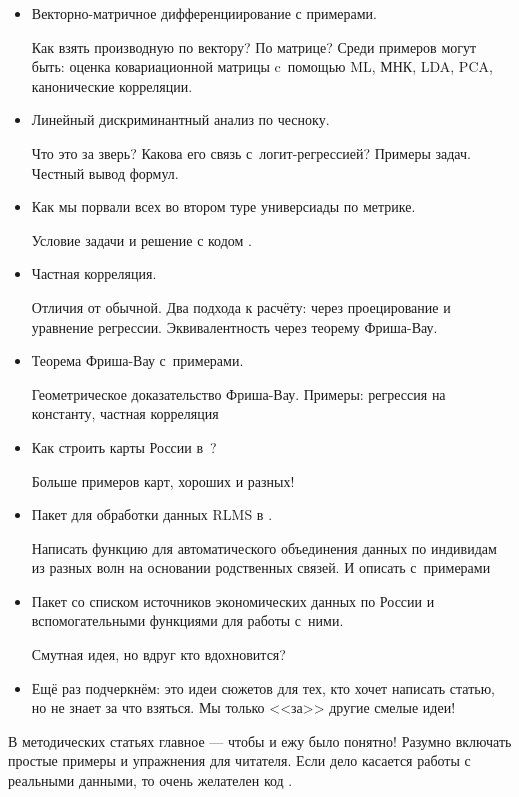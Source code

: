 \documentclass[final,pdftex]{../../template/epsilonj}
\begin{document}
\begin{itemize}
\item Векторно-матричное дифференциирование с примерами. 

Как взять производную по вектору? По матрице? Среди примеров могут быть: оценка  ковариационной матрицы c~помощью ML, МНК, LDA, PCA, канонические корреляции.
\item Линейный дискриминантный анализ по чесноку. 

Что это за зверь? Какова его связь с~логит-регрессией? Примеры задач. Честный вывод формул. 

\item Как мы порвали всех во втором туре универсиады по метрике. 

Условие задачи и решение с кодом .

\item Частная корреляция. 

Отличия от обычной. Два подхода к расчёту: через проецирование и уравнение регрессии. Эквивалентность через теорему Фриша-Вау.

\item Теорема Фриша-Вау с~примерами.

Геометрическое доказательство Фриша-Вау. Примеры: регрессия на константу, частная корреляция

\item Как строить карты России в~?

Больше примеров карт, хороших и разных!

\item Пакет для обработки данных RLMS в .

Написать функцию для автоматического объединения данных по индивидам из разных волн на основании родственных связей. И описать с~примерами

\item Пакет со списком источников экономических данных по России и вспомогательными функциями для работы с~ними.

Смутная идея, но вдруг кто вдохновится?


\item Ещё раз подчеркнём: это идеи сюжетов для тех, кто хочет написать статью, но не знает за что взяться. Мы только <<за>> другие смелые идеи!

\end{itemize}



В методических статьях главное --- чтобы и ежу было понятно! Разумно включать простые примеры и упражнения для читателя. Если дело касается работы с реальными данными, то очень желателен код .
\end{document}
